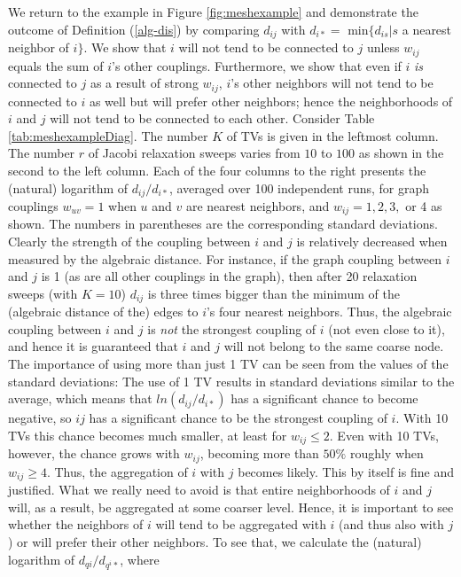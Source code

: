 \documentclass[final]{siamltex}
\begin{document}
\par We return to the example in Figure \ref{fig:meshexample} and demonstrate the
outcome of Definition (\ref{alg-dis}) by comparing $d_{ij}$ with $d_{i*} = $ min$\{d_{is}|s$ a nearest neighbor of $i\}$.
We show that $i$ will not tend to be connected to $j$ unless $w_{ij}$ equals the sum of $i$'s other couplings. Furthermore, we show that even if $i$ {\it is} connected to $j$ as a result of strong $w_{ij}$, $i$'s other neighbors will not tend to be connected to $i$ as well but will prefer other neighbors; hence the neighborhoods of $i$ and $j$ will not tend to be connected to each other.
Consider Table
\ref{tab:meshexampleDiag}. The number $K$ of TVs is given in the leftmost column.
The number $r$ of Jacobi relaxation sweeps
varies from $10$ to $100$ as shown in the second to the left column. Each of
the four columns to the right presents the (natural) logarithm of $d_{ij}/d_{i*}$,
averaged over 100 independent runs, for graph
couplings $w_{uv}=1$ when $u$ and $v$ are nearest neighbors, and
$w_{ij}=1,2,3,$ or 4 as shown. The numbers in parentheses are the corresponding standard deviations.
Clearly the strength of the coupling between $i$
and $j$ is relatively decreased when measured by the algebraic distance. For
instance, if the graph coupling between $i$ and $j$ is 1 (as are
all other couplings in the graph), then after 20 relaxation sweeps (with $K=10$)
$d_{ij}$ is three times bigger than the minimum of the
(algebraic distance of the) edges to $i$'s four nearest neighbors. Thus,
 the algebraic coupling between $i$ and $j$ is
{\it not} the strongest coupling of $i$ (not even close to it),
and hence it is guaranteed that $i$ and $j$ will not belong to the same coarse node.
The importance of using more than just 1 TV
can be seen from the values of the standard deviations: The use of 1 TV results in standard deviations similar to the average, which means that $ln(d_{ij}/d_{i*})$ has
a significant chance to become negative, so $ij$ has a significant chance to be the strongest
coupling of $i$. With 10 TVs this chance becomes much smaller, at least for $w_{ij} \leq 2$.
Even with 10 TVs, however, the chance grows with
$w_{ij}$, becoming more than $50\%$ roughly when $w_{ij} \geq 4$.
Thus, the aggregation of $i$ with $j$  becomes likely. This by itself is fine and justified.
What we really need to avoid is that entire neighborhoods of $i$ and $j$ will, as a result, be aggregated at some coarser level.
Hence, it is important to see whether the neighbors of $i$ will tend to be aggregated with $i$ (and thus also with $j$) or will prefer their other neighbors. To see that, we calculate the (natural) logarithm of $d_{qi}/d_{q^i*}$, where
\end{document}
